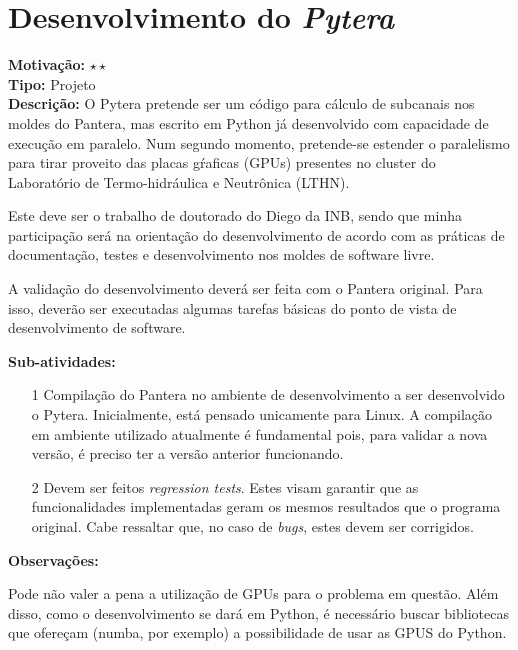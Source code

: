 \chapter{Desenvolvimento do \textit{Pytera}}
\label{pytera}

\textbf{Motivação:} $\star\star$\\

\textbf{Tipo:} Projeto\\

\textbf{Descrição:} O Pytera pretende ser um código para cálculo de subcanais 
nos moldes do Pantera, mas escrito em Python já desenvolvido com capacidade 
de execução em paralelo. Num segundo momento, pretende-se estender o paralelismo 
para tirar proveito das placas gŕaficas (GPUs) presentes no cluster do Laboratório 
de Termo-hidráulica e Neutrônica (LTHN).

Este deve ser o trabalho de doutorado do Diego da INB, sendo que minha participação 
será na orientação do desenvolvimento de acordo com as práticas de documentação, 
testes e desenvolvimento nos moldes de software livre.

A validação do desenvolvimento deverá ser feita com o Pantera original. Para isso, deverão 
ser executadas algumas tarefas básicas do ponto de vista de desenvolvimento de software.

\textbf{Sub-atividades:}

\begin{itemize}
	\item[1] Compilação do Pantera no ambiente de desenvolvimento a ser desenvolvido o Pytera. 
	Inicialmente, está pensado unicamente para Linux. A compilação em ambiente utilizado atualmente 
	é fundamental pois, para validar a nova versão, é preciso ter a versão anterior funcionando.
	\item[2] Devem ser feitos \textit{regression tests}. Estes visam garantir que as funcionalidades 
	implementadas geram os mesmos resultados que o programa original. Cabe ressaltar que, no caso de \textit{bugs}, 
	estes devem ser corrigidos.
\end{itemize}

\textbf{Observações:}

Pode não valer a pena a utilização de GPUs para o problema em questão. Além disso, 
como o desenvolvimento se dará em Python, é necessário buscar bibliotecas que 
ofereçam (numba, por exemplo) a possibilidade de usar as GPUS do Python.\\

